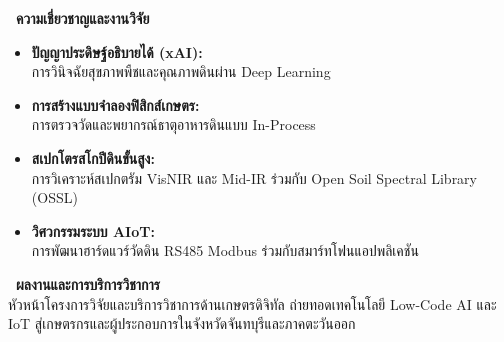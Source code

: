 \begin{minipage}[t]{0.48\textwidth}
    {\fontsize{11}{14}\selectfont\bfseries\color{teal!80!black}\textbullet\ ความเชี่ยวชาญและงานวิจัย}\\[6pt]
    {\fontsize{9.5}{13.5}\selectfont
    \begin{itemize}[leftmargin=1.4em, itemsep=3pt]
        \item \textbf{ปัญญาประดิษฐ์อธิบายได้ (xAI):}\\
        การวินิจฉัยสุขภาพพืชและคุณภาพดินผ่าน Deep Learning
        \item \textbf{การสร้างแบบจำลองฟิสิกส์เกษตร:}\\
        การตรวจวัดและพยากรณ์ธาตุอาหารดินแบบ In-Process
        \item \textbf{สเปกโตรสโกปีดินขั้นสูง:}\\
        การวิเคราะห์สเปกตรัม VisNIR และ Mid-IR ร่วมกับ Open Soil Spectral Library (OSSL)
        \item \textbf{วิศวกรรมระบบ AIoT:}\\
        การพัฒนาฮาร์ดแวร์วัดดิน RS485 Modbus ร่วมกับสมาร์ทโฟนแอปพลิเคชัน
    \end{itemize}
    }

    \vspace{12pt}
    {\fontsize{11}{14}\selectfont\bfseries\color{teal!80!black}\textbullet\ ผลงานและการบริการวิชาการ}\\[6pt]
    {\fontsize{9}{12.5}\selectfont
    หัวหน้าโครงการวิจัยและบริการวิชาการด้านเกษตรดิจิทัล ถ่ายทอดเทคโนโลยี Low-Code AI และ IoT สู่เกษตรกรและผู้ประกอบการในจังหวัดจันทบุรีและภาคตะวันออก
    }
\end{minipage}

\vfill
\clearpage
